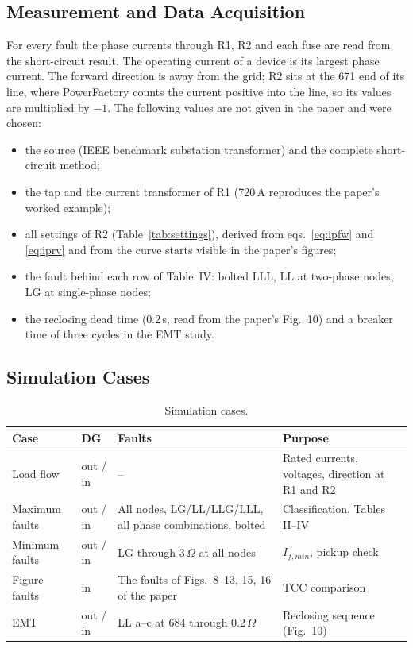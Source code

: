 \documentclass[12pt,letterpaper]{article}
\newcommand{\hd}{\rowcolor{headc}}
\newcommand{\ohm}{\,\ensuremath{\Omega}}
\newcommand{\PF}{PowerFactory}
\begin{document}
\subsection{Measurement and Data Acquisition}
\label{sec:assumptions}
For every fault the phase currents through R1, R2 and each fuse are read from the short-circuit result. The
operating current of a device is its largest phase current. The forward direction is away from the grid; R2
sits at the 671 end of its line, where \PF{} counts the current positive into the line, so its values are
multiplied by $-1$. The following values are not given in the paper and were chosen:
\begin{itemize}
\item the source (IEEE benchmark substation transformer) and the complete short-circuit method;
\item the tap and the current transformer of R1 (720\,A reproduces the paper's worked example);
\item all settings of R2 (Table~\ref{tab:settings}), derived from eqs.~\eqref{eq:ipfw} and \eqref{eq:iprv}
      and from the curve starts visible in the paper's figures;
\item the fault behind each row of Table~IV: bolted LLL, LL at two-phase nodes, LG at single-phase nodes;
\item the reclosing dead time (0.2\,s, read from the paper's Fig.~10) and a breaker time of three cycles in
      the EMT study.
\end{itemize}

\subsection{Simulation Cases}
\begin{table}[H]
\centering\small
\begin{tabularx}{\textwidth}{@{}llLL@{}}
\toprule
\hd\textbf{Case} & \textbf{DG} & \textbf{Faults} & \textbf{Purpose} \\
\midrule
Load flow & out / in & -- & Rated currents, voltages, direction at R1 and R2 \\
Maximum faults & out / in & All nodes, LG/LL/LLG/LLL, all phase combinations, bolted & Classification, Tables II--IV \\
Minimum faults & out / in & LG through 3\ohm{} at all nodes & $I_{f,min}$, pickup check \\
Figure faults & in & The faults of Figs.~8--13, 15, 16 of the paper & TCC comparison \\
EMT & out / in & LL a--c at 684 through 0.2\ohm & Reclosing sequence (Fig.~10) \\
\bottomrule
\end{tabularx}
\caption{Simulation cases.}
\label{tab:cases}
\end{table}
\end{document}

